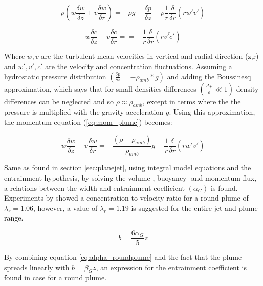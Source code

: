 \begin{equation}
    \rho(w\frac{\delta w}{\delta z} + v \frac{\delta w}{\delta r}) = - \rho g - \frac{\delta p}{\delta z} - \rho \frac{1}{r}\frac{\delta}{\delta r}(r \overline{w'v'})
    \label{eq:mom_plume}
\end{equation}

\begin{equation}
    w\frac{\delta c}{\delta z} + v \frac{\delta c}{\delta r} = = - \frac{1}{r}\frac{\delta}{\delta r} (r\overline{v'c'})
    \label{eq:mass_plume}
\end{equation}\newline

\noindent Where $w, v$ are the turbulent mean velocities in vertical and radial direction (z,r) and $w', v', c'$ are the velocity and concentration fluctuations. Assuming a hydrostatic pressure distribution $( \frac{\delta p}{\delta z} = - \rho_{amb}*g)$ and adding the Boussinesq approximation, which says that for small densities differences $(\frac{\Delta \rho}{\rho} \ll 1)$ density differences can be neglected and so $\rho \approx \rho_{amb}$, except in terms where the the pressure is multiplied with the gravity acceleration $g$. Using this approximation, the momentum equation (\ref{eq:mom_plume}) becomes:

\begin{equation}
    w \frac{\delta w}{\delta z} + v \frac{\delta w}{\delta r} = - \frac{(\rho - \rho_{amb})}{\rho_{amb}}g - \frac{1}{r}\frac{\delta }{\delta r}(r\overline{w'v'})
\end{equation}

\noindent Same as found in section \ref{sec:planejet}, using integral model equations and the entrainment hypothesis, by solving the volume-, buoyancy- and momentum flux, a relations between the width and entrainment coefficient $(\alpha_G)$ is found. Experiments by \cite{Papanicolaou+} showed a concentration to velocity ratio for a round plume of $\lambda_r = 1.06$, however, a value of $\lambda_r = 1.19$ is suggested for the entire jet and plume range.

\begin{equation}
    b = \frac{6 \alpha_G}{5}z
    \label{eq:alpha_roundplume}
\end{equation}

\noindent By combining equation \ref{eq:alpha_roundplume} and the fact that the plume spreads linearly with $b = \beta_Gz$, an expression for the entrainment coefficient is found in case for a round plume.

